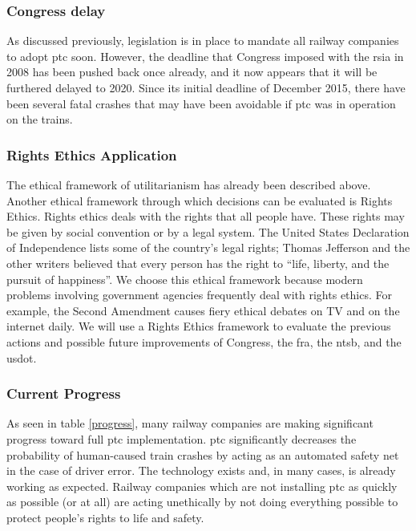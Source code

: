 \documentclass[11pt, titlepage]{article}
\begin{document}
\subsubsection{Congress delay}

As discussed previously, legislation is in place to mandate all railway companies to
adopt \gls{ptc} soon. However, the deadline that Congress imposed with the
\gls{rsia} in 2008 has been pushed back once already, and it now appears that it
will be furthered delayed to 2020. Since its initial deadline of December 2015,
there have been several fatal crashes that may have been avoidable if \gls{ptc} was
in operation on the trains.

\subsubsection{Rights Ethics Application}

The ethical framework of utilitarianism has already been described above. Another
ethical framework through which decisions can be evaluated is Rights Ethics. Rights
ethics deals with the rights that all people have. These rights may be given by
social convention or by a legal system. The United States Declaration of
Independence lists some of the country’s legal rights; Thomas Jefferson and the
other writers believed that every person has the right to ``life, liberty, and the
pursuit of happiness''. We choose this ethical framework because modern problems
involving government agencies frequently deal with rights ethics. For example, the
Second Amendment causes fiery ethical debates on TV and on the internet daily. We
will use a Rights Ethics framework to evaluate the previous actions and possible
future improvements of Congress, the \gls{fra}, the \gls{ntsb}, and the
\gls{usdot}.

\subsubsection{Current Progress}

As seen in table \ref{progress}, many railway companies are making significant
progress toward full \gls{ptc} implementation. \gls{ptc} significantly decreases the
probability of human-caused train crashes by acting as an automated safety net in
the case of driver error. The technology exists and, in many cases, is already
working as expected. Railway companies which are not installing \gls{ptc} as quickly
as possible (or at all) are acting unethically by not doing everything possible to
protect people’s rights to life and safety.
\end{document}
